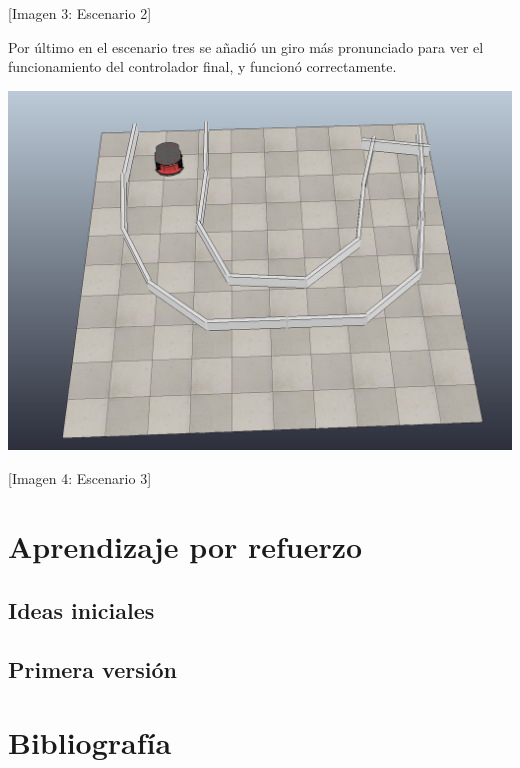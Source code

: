 \documentclass[14pt]{extarticle}
\theoremstyle{definition}
\theoremstyle{remark}
\begin{document}
\begin{center}
	[Imagen 3: Escenario 2]
\end{center}
Por último en el escenario tres se añadió un giro más pronunciado para ver el funcionamiento del controlador final, y funcionó correctamente.
\begin{center}
	\includegraphics[scale=0.4]{pioneer_corredor_dos.png}
\end{center}
\begin{center}
	[Imagen 4: Escenario 3]
\end{center}
\newpage
\section{Aprendizaje por refuerzo}\label{sec:aprendizajeporrefuerzo}
\subsection{Ideas iniciales}\label{subsec:ideasiniciales}
\subsection{Primera versión}\label{subsec:primeraversion}

\newpage
\section{Bibliografía}\label{sec:bibliografia}


\end{document}
